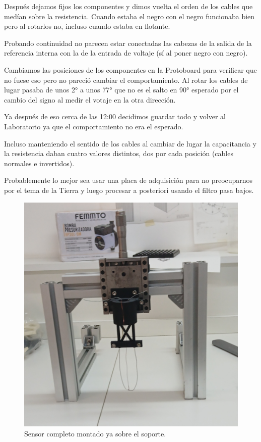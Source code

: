 Después dejamos fijos los componentes y dimos vuelta el orden de los cables que medían sobre la resistencia. Cuando estaba el negro con el negro funcionaba bien pero al rotarlos no, incluso cuando estaba en flotante. 

Probando continuidad no parecen estar conectadas las cabezas de la salida de la referencia interna con la de la entrada de voltaje (sí al poner negro con negro). 

Cambiamos las posiciones de los componentes en la Protoboard para verificar que no fuese eso pero no pareció cambiar el comportamiento. Al rotar los cables de lugar pasaba de unos 2° a unos 77° que no es el salto en 90° esperado por el cambio del signo al medir el votaje en la otra dirección. %

Ya después de eso cerca de las 12:00 decidimos guardar todo y volver al Laboratorio ya que el comportamiento no era el esperado. 

Incluso manteniendo el sentido de los cables al cambiar de lugar la capacitancia y la resistencia daban cuatro valores distintos, dos por cada posición (cables normales e invertidos). 

Probablemente lo mejor sea usar una placa de adquisición para no preocuparnos por el tema de la Tierra y luego procesar a posteriori usando el filtro pasa bajos. 

\begin{figure}[!ht]
	\centering
	\includegraphics[width=0.7\linewidth]{Figures/12_05_2025/20250512_140434.JPG}
	\caption{Sensor completo montado ya sobre el soporte.}
	\label{fig:foto_sensor_completo_12_05_2025}
\end{figure}